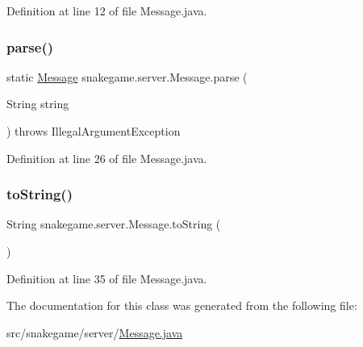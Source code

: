 Definition at line 12 of file Message.\+java.

\mbox{\label{classsnakegame_1_1server_1_1_message_a18e375c0d7b140c6b4d141b870542a4a}} 
\subsubsection{\texorpdfstring{parse()}{parse()}}
{\footnotesize\ttfamily static \mbox{\hyperlink{classsnakegame_1_1server_1_1_message}{Message}} snakegame.\+server.\+Message.\+parse (\begin{DoxyParamCaption}\item[{String}]{string }\end{DoxyParamCaption}) throws Illegal\+Argument\+Exception\hspace{0.3cm}{\ttfamily [static]}}



Definition at line 26 of file Message.\+java.

\mbox{\label{classsnakegame_1_1server_1_1_message_a9e38b76d6815d73d7c14a28e8640b1c3}} 
\subsubsection{\texorpdfstring{to\+String()}{toString()}}
{\footnotesize\ttfamily String snakegame.\+server.\+Message.\+to\+String (\begin{DoxyParamCaption}{ }\end{DoxyParamCaption})}



Definition at line 35 of file Message.\+java.



The documentation for this class was generated from the following file\+:\begin{DoxyCompactItemize}
\item 
src/snakegame/server/\mbox{\hyperlink{_message_8java}{Message.\+java}}\end{DoxyCompactItemize}
